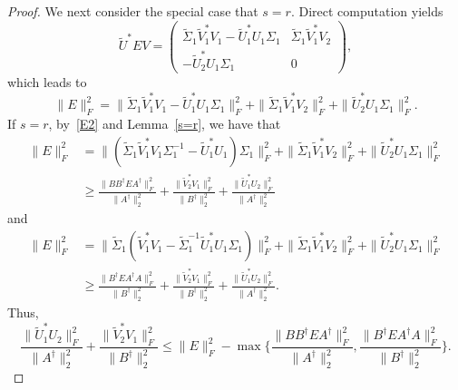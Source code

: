 \documentclass[11pt]{article}
\begin{document}
\begin{proof}
We next consider the special case that $s=r$. Direct computation yields
\begin{displaymath}
\widetilde{U}^{\ast}EV=\begin{pmatrix}
\widetilde{\Sigma}_{1}\widetilde{V}_{1}^{\ast}V_{1}-\widetilde{U}_{1}^{\ast}U_{1}\Sigma_{1} & \widetilde{\Sigma}_{1}\widetilde{V}_{1}^{\ast}V_{2} \\
-\widetilde{U}_{2}^{\ast}U_{1}\Sigma_{1} & 0
\end{pmatrix},
\end{displaymath}
which leads to
\begin{equation}\label{E2}
\|E\|_{F}^{2}=\|\widetilde{\Sigma}_{1}\widetilde{V}_{1}^{\ast}V_{1}-\widetilde{U}_{1}^{\ast}U_{1}\Sigma_{1}\|_{F}^{2}+\|\widetilde{\Sigma}_{1}\widetilde{V}_{1}^{\ast}V_{2}\|_{F}^{2}+\|\widetilde{U}_{2}^{\ast}U_{1}\Sigma_{1}\|_{F}^{2}.
\end{equation}
If $s=r$, by~\eqref{E2} and Lemma~\ref{s=r}, we have that
\begin{align*}
\|E\|_{F}^{2}&=\|(\widetilde{\Sigma}_{1}\widetilde{V}_{1}^{\ast}V_{1}\Sigma_{1}^{-1}-\widetilde{U}_{1}^{\ast}U_{1})\Sigma_{1}\|_{F}^{2}+\|\widetilde{\Sigma}_{1}\widetilde{V}_{1}^{\ast}V_{2}\|_{F}^{2}+\|\widetilde{U}_{2}^{\ast}U_{1}\Sigma_{1}\|_{F}^{2}\\
&\geq\frac{\|BB^{\dagger}EA^{\dagger}\|_{F}^{2}}{\|A^{\dagger}\|_{2}^{2}}+\frac{\|\widetilde{V}_{2}^{\ast}V_{1}\|_{F}^{2}}{\|B^{\dagger}\|_{2}^{2}}+\frac{\|\widetilde{U}_{1}^{\ast}U_{2}\|_{F}^{2}}{\|A^{\dagger}\|_{2}^{2}}
\end{align*}
and
\begin{align*}
\|E\|_{F}^{2}&=\|\widetilde{\Sigma}_{1}(\widetilde{V}_{1}^{\ast}V_{1}-\widetilde{\Sigma}_{1}^{-1}\widetilde{U}_{1}^{\ast}U_{1}\Sigma_{1})\|_{F}^{2}+\|\widetilde{\Sigma}_{1}\widetilde{V}_{1}^{\ast}V_{2}\|_{F}^{2}+\|\widetilde{U}_{2}^{\ast}U_{1}\Sigma_{1}\|_{F}^{2}\\
&\geq\frac{\|B^{\dagger}EA^{\dagger}A\|_{F}^{2}}{\|B^{\dagger}\|_{2}^{2}}+\frac{\|\widetilde{V}_{2}^{\ast}V_{1}\|_{F}^{2}}{\|B^{\dagger}\|_{2}^{2}}+\frac{\|\widetilde{U}_{1}^{\ast}U_{2}\|_{F}^{2}}{\|A^{\dagger}\|_{2}^{2}}.
\end{align*}
Thus,
\begin{equation}\label{up-UV2}
\frac{\|\widetilde{U}_{1}^{\ast}U_{2}\|_{F}^{2}}{\|A^{\dagger}\|_{2}^{2}}+\frac{\|\widetilde{V}_{2}^{\ast}V_{1}\|_{F}^{2}}{\|B^{\dagger}\|_{2}^{2}}\leq\|E\|_{F}^{2}-\max\bigg\{\frac{\|BB^{\dagger}EA^{\dagger}\|_{F}^{2}}{\|A^{\dagger}\|_{2}^{2}},\frac{\|B^{\dagger}EA^{\dagger}A\|_{F}^{2}}{\|B^{\dagger}\|_{2}^{2}}\bigg\}.

\end{equation}
\end{proof}
\end{document}
